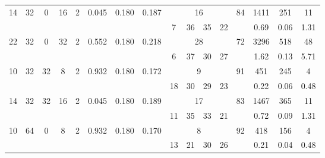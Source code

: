 \begin{landscape}
\begin{savenotes}
\begin{longtable}{cccccccccccccccc}
\midrule

\multirow{2}{*}{14} & \multirow{2}{*}{32} & \multirow{2}{*}{0} & \multirow{2}{*}{16} & \multirow{2}{*}{2} & \multirow{2}{*}{0.045} & \multirow{2}{*}{0.180} & \multirow{2}{*}{0.187} & \multicolumn{4}{c}{16} & \multirow{2}{*}{84} & 1411 & 251 & 11 \\
\cmidrule{9-12}
 &  &  &  &  &  &  &  & 7 & 36 & 35 & 22 &  & 0.69 & 0.06 & 1.31 \\


\midrule

\multirow{2}{*}{22} & \multirow{2}{*}{32} & \multirow{2}{*}{0} & \multirow{2}{*}{32} & \multirow{2}{*}{2} & \multirow{2}{*}{0.552} & \multirow{2}{*}{0.180} & \multirow{2}{*}{0.218} & \multicolumn{4}{c}{28} & \multirow{2}{*}{72} & 3296 & 518 & 48 \\
\cmidrule{9-12}
 &  &  &  &  &  &  &  & 6 & 37 & 30 & 27 &  & 1.62 & 0.13 & 5.71 \\


\midrule \midrule

\multirow{2}{*}{10} & \multirow{2}{*}{32} & \multirow{2}{*}{32} & \multirow{2}{*}{8} & \multirow{2}{*}{2} & \multirow{2}{*}{0.932} & \multirow{2}{*}{0.180} & \multirow{2}{*}{0.172} & \multicolumn{4}{c}{9} & \multirow{2}{*}{91} & 451 & 245 & 4 \\
\cmidrule{9-12}
 &  &  &  &  &  &  &  & 18 & 30 & 29 & 23 &  & 0.22 & 0.06 & 0.48 \\



\midrule

\multirow{2}{*}{14} & \multirow{2}{*}{32} & \multirow{2}{*}{32} & \multirow{2}{*}{16} & \multirow{2}{*}{2} & \multirow{2}{*}{0.045} & \multirow{2}{*}{0.180} & \multirow{2}{*}{0.189} & \multicolumn{4}{c}{17} & \multirow{2}{*}{83} & 1467 & 365 & 11 \\
\cmidrule{9-12}
 &  &  &  &  &  &  &  & 11 & 35 & 33 & 21 &  & 0.72 & 0.09 & 1.31 \\


\midrule \midrule

\multirow{2}{*}{10} & \multirow{2}{*}{64} & \multirow{2}{*}{0} & \multirow{2}{*}{8} & \multirow{2}{*}{2} & \multirow{2}{*}{0.932} & \multirow{2}{*}{0.180} & \multirow{2}{*}{0.170} & \multicolumn{4}{c}{8} & \multirow{2}{*}{92} & 418 & 156 & 4 \\
\cmidrule{9-12}
 &  &  &  &  &  &  &  & 13 & 21 & 30 & 26 &  & 0.21 & 0.04 & 0.48 \\

\midrule


\end{longtable}
\end{savenotes}
\end{landscape}
